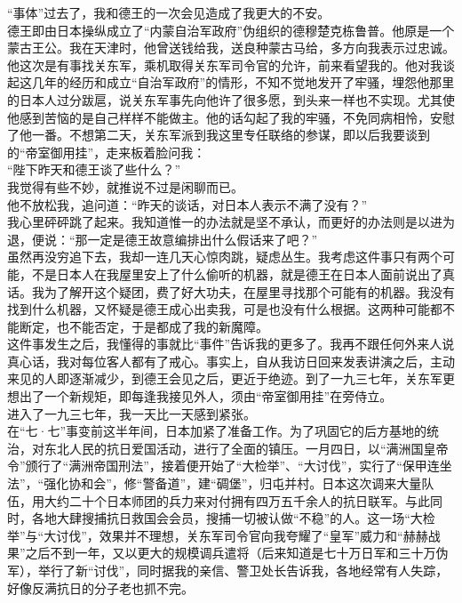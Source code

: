 “事体”过去了，我和德王的一次会见造成了我更大的不安。\\

德王即由日本操纵成立了“内蒙自治军政府”伪组织的德穆楚克栋鲁普。他原是一个蒙古王公。我在天津时，他曾送钱给我，送良种蒙古马给，多方向我表示过忠诚。他这次是有事找关东军，乘机取得关东军司令官的允许，前来看望我的。他对我谈起这几年的经历和成立“自治军政府”的情形，不知不觉地发开了牢骚，埋怨他那里的日本人过分跋扈，说关东军事先向他许了很多愿，到头来一样也不实现。尤其使他感到苦恼的是自己样样不能做主。他的话勾起了我的牢骚，不免同病相怜，安慰了他一番。不想第二天，关东军派到我这里专任联络的参谋，即以后我要谈到的“帝室御用挂”，走来板着脸问我：\\

“陛下昨天和德王谈了些什么？”\\

我觉得有些不妙，就推说不过是闲聊而已。\\

他不放松我，追问道：“昨天的谈话，对日本人表示不满了没有？”\\

我心里砰砰跳了起来。我知道惟一的办法就是坚不承认，而更好的办法则是以进为退，便说：“那一定是德王故意编排出什么假话来了吧？”\\

虽然再没穷追下去，我却一连几天心惊肉跳，疑虑丛生。我考虑这件事只有两个可能，不是日本人在我屋里安上了什么偷听的机器，就是德王在日本人面前说出了真话。我为了解开这个疑团，费了好大功夫，在屋里寻找那个可能有的机器。我没有找到什么机器，又怀疑是德王成心出卖我，可是也没有什么根据。这两种可能都不能断定，也不能否定，于是都成了我的新魔障。\\

这件事发生之后，我懂得的事就比“事件”告诉我的更多了。我再不跟任何外来人说真心话，我对每位客人都有了戒心。事实上，自从我访日回来发表讲演之后，主动来见的人即逐渐减少，到德王会见之后，更近于绝迹。到了一九三七年，关东军更想出了一个新规矩，即每逢我接见外人，须由“帝室御用挂”在旁侍立。\\

进入了一九三七年，我一天比一天感到紧张。\\

在“七·七”事变前这半年间，日本加紧了准备工作。为了巩固它的后方基地的统治，对东北人民的抗日爱国活动，进行了全面的镇压。一月四日，以“满洲国皇帝令”颁行了“满洲帝国刑法”，接着便开始了“大检举”、“大讨伐”，实行了“保甲连坐法”，“强化协和会”，修“警备道”，建“碉堡”，归屯并村。日本这次调来大量队伍，用大约二十个日本师团的兵力来对付拥有四万五千余人的抗日联军。与此同时，各地大肆搜捕抗日救国会会员，搜捕一切被认做“不稳”的人。这一场“大检举”与“大讨伐”，效果并不理想，关东军司令官向我夸耀了“皇军”威力和“赫赫战果”之后不到一年，又以更大的规模调兵遣将（后来知道是七十万日军和三十万伪军），举行了新“讨伐”，同时据我的亲信、警卫处长告诉我，各地经常有人失踪，好像反满抗日的分子老也抓不完。\\

